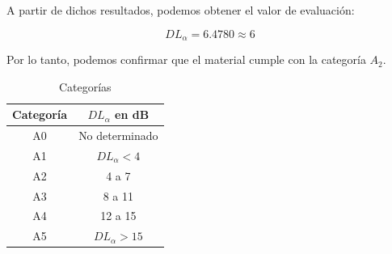 \par A partir de dichos resultados, podemos obtener el valor de evaluación:

\begin{equation}
    \boxed{DL_{\alpha} =  6.4780 \approx 6}
\end{equation}

\par Por lo tanto, podemos confirmar que el material cumple con la categoría $A_2$.


\begin{table}[H]
\setlength\arrayrulewidth{1pt}
    \centering
    \begin{tabular}{|c|c|} \hline
        \textbf{Categoría} & \textbf{$DL_\alpha$ en dB} \\ \hline \hline
        A0& No determinado \\ \hline
        A1& $DL_\alpha < 4$ \\ \hline
        A2& 4 a 7 \\ \hline
        A3& 8 a 11 \\ \hline
        A4& 12 a 15 \\ \hline
        A5& $DL_\alpha >15$ \\ \hline
    \end{tabular}
    \caption{Categorías}
    \label{tab:my_label}
\end{table}